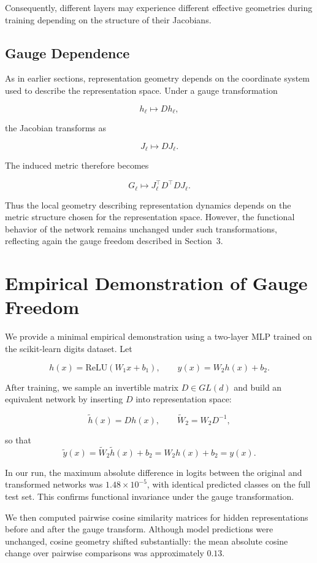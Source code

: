 \documentclass[11pt]{article}
\begin{document}
Consequently, different layers may experience different effective
geometries during training depending on the structure of their Jacobians.

\subsection{Gauge Dependence}

As in earlier sections, representation geometry depends on the coordinate
system used to describe the representation space.
Under a gauge transformation

\[
h_\ell \mapsto D h_\ell ,
\]

the Jacobian transforms as

\[
J_\ell \mapsto D J_\ell .
\]

The induced metric therefore becomes

\[
G_\ell \mapsto J_\ell^\top D^\top D J_\ell .
\]

Thus the local geometry describing representation dynamics depends on the
metric structure chosen for the representation space.
However, the functional behavior of the network remains unchanged under
such transformations, reflecting again the gauge freedom described in
Section~3.

\section{Empirical Demonstration of Gauge Freedom}

We provide a minimal empirical demonstration using a two-layer MLP trained
on the scikit-learn digits dataset.  Let

\[
h(x)=\mathrm{ReLU}(W_1 x+b_1), \qquad y(x)=W_2 h(x)+b_2 .
\]

After training, we sample an invertible matrix $D \in GL(d)$ and build an
equivalent network by inserting $D$ into representation space:

\[
\tilde h(x)=D h(x), \qquad \tilde W_2 = W_2 D^{-1},
\]

so that
\[
\tilde y(x)=\tilde W_2 \tilde h(x)+b_2 = W_2 h(x)+b_2 = y(x).
\]

In our run, the maximum absolute difference in logits between the original
and transformed networks was $1.48\times 10^{-5}$, with identical predicted
classes on the full test set.  This confirms functional invariance under
the gauge transformation.

We then computed pairwise cosine similarity matrices for hidden
representations before and after the gauge transform.  Although model
predictions were unchanged, cosine geometry shifted substantially:
the mean absolute cosine change over pairwise comparisons was
approximately $0.13$.
\end{document}
